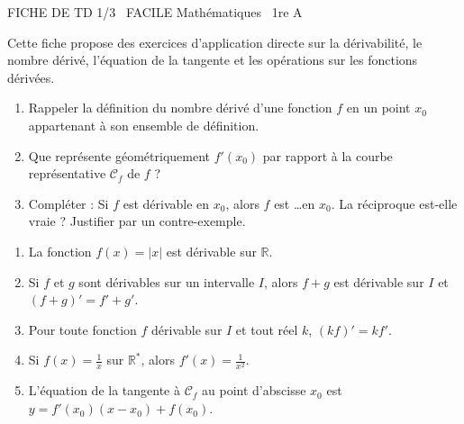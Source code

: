 \documentclass[11pt]{article}
\begin{document}
\begin{tcolorbox}[enhanced,colback=popink,colframe=popink,arc=10pt,boxrule=0pt,left=12pt,right=12pt,top=9pt,bottom=9pt]
{\color{white}\popxbold\small FICHE DE TD 1/3 \textbullet\ FACILE \hfill Mathématiques \textbullet\ 1re A\par}
\end{tcolorbox}
\vspace{4pt}
Cette fiche propose des exercices d'application directe sur la dérivabilité, le nombre dérivé, l'équation de la tangente et les opérations sur les fonctions dérivées.

\begin{exercice}
\begin{enumerate}
    \item Rappeler la définition du nombre dérivé d'une fonction $f$ en un point $x_0$ appartenant à son ensemble de définition.
    \item Que représente géométriquement $f'(x_0)$ par rapport à la courbe représentative $\mathcal{C}_f$ de $f$ ?
    \item Compléter : Si $f$ est dérivable en $x_0$, alors $f$ est \ldots en $x_0$. La réciproque est-elle vraie ? Justifier par un contre-exemple.
\end{enumerate}
\end{exercice}

\begin{exercice}
\begin{enumerate}
    \item La fonction $f(x)=|x|$ est dérivable sur $\mathbb{R}$.
    \item Si $f$ et $g$ sont dérivables sur un intervalle $I$, alors $f+g$ est dérivable sur $I$ et $(f+g)' = f' + g'$.
    \item Pour toute fonction $f$ dérivable sur $I$ et tout réel $k$, $(kf)' = k f'$.
    \item Si $f(x) = \frac{1}{x}$ sur $\mathbb{R}^*$, alors $f'(x) = \frac{1}{x^2}$.
    \item L'équation de la tangente à $\mathcal{C}_f$ au point d'abscisse $x_0$ est $y = f'(x_0)(x - x_0) + f(x_0)$.
\end{enumerate}
\end{exercice}
\end{document}
